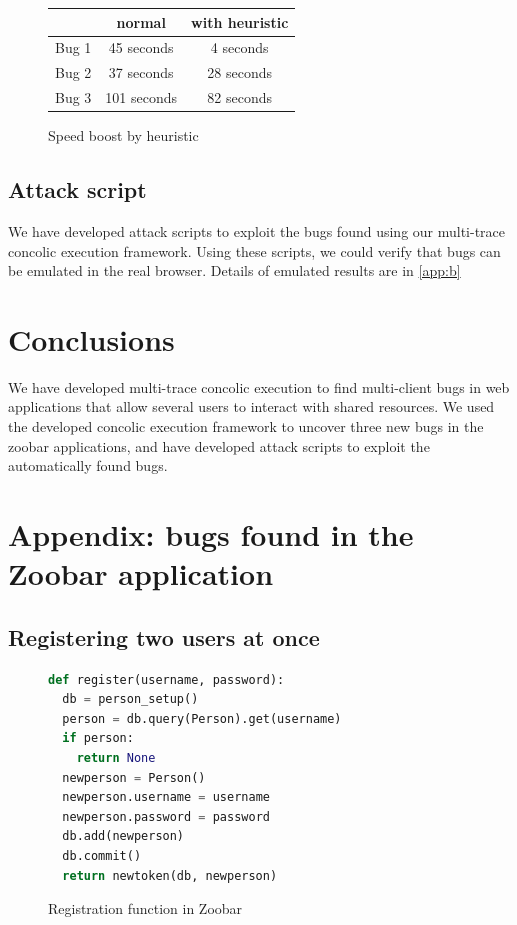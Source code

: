 \documentclass{llncs}
\begin{document}
\begin{figure}
  \begin{center}
    \begin{tabular}{l|c|c}
      \hline
      & normal & with heuristic \\
      \hline
      Bug 1 & 45 seconds & 4 seconds \\
      Bug 2 & 37 seconds & 28 seconds \\
      Bug 3 & 101 seconds & 82 seconds \\
      \hline
    \end{tabular}
  \end{center}
  \caption{Speed boost by heuristic}
  \label{fig:speed}
\end{figure}

\subsection{Attack script}

We have developed attack scripts to exploit the bugs found using our
multi-trace concolic execution framework. Using these scripts, we
could verify that bugs can be emulated in the real browser. Details of
emulated results are in \ref{app:b}

\section{Conclusions}

We have developed multi-trace concolic execution to find multi-client
bugs in web applications that allow several users to interact with
shared resources. We used the developed concolic execution framework
to uncover three new bugs in the zoobar applications, and have
developed attack scripts to exploit the automatically found bugs.

\newpage
\appendix

\section{Appendix: bugs found in the Zoobar application}
\label{app:a}

\subsection{Registering two users at once}

\begin{figure}
  \begin{lstlisting}[language=Python]
def register(username, password):
  db = person_setup()
  person = db.query(Person).get(username)
  if person:
    return None
  newperson = Person()
  newperson.username = username
  newperson.password = password
  db.add(newperson)
  db.commit()
  return newtoken(db, newperson)
  \end{lstlisting}
  \caption{Registration function in Zoobar}
  \label{fig:registration}
\end{figure}
\end{document}
